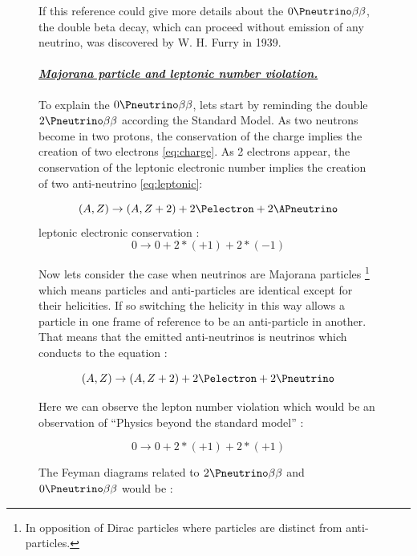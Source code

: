 \begin{figure}[!hbtp]
  If this reference \cite{ref:wikipedia_beta} could give more details about the \(0\Pneutrino\beta\beta\), the double beta decay, which can proceed without 
  emission of any neutrino, was discovered by W. H. Furry in 1939. 

  \paragraph{\underline{\emph{Majorana particle and leptonic number violation.}}}
  
  To explain the \(0\Pneutrino\beta\beta\), lets start by reminding the double \(2\Pneutrino\beta\beta\) according the Standard Model. 
  As two neutrons become in two protons, the conservation of the charge implies the creation of two electrons \ref{eq:charge}. As 2 electrons appear, 
  the conservation of the leptonic electronic number implies the creation of two anti-neutrino \ref{eq:leptonic}:  
  
  \begin{equation} \label{eq:charge}
    (A,Z) \rightarrow (A,Z+2) + 2\Pelectron + 2\APneutrino
  \end{equation}
  leptonic electronic conservation :
  \begin{equation} \label{eq:leptonic}
    0 \rightarrow 0 + 2*(+1) + 2*(-1)
  \end{equation}
  
  Now lets consider the case when neutrinos are Majorana particles \footnote{ In opposition of Dirac particles where particles are distinct from anti-particles.}
  which means particles and anti-particles are identical except for their helicities. If so switching the helicity in this way allows 
  a particle in one frame of reference to be an anti-particle in another.
  \\
  That means that the emitted anti-neutrinos is neutrinos which conducts to the equation :
  
  \begin{equation}
    (A,Z) \rightarrow (A,Z+2) + 2\Pelectron + 2\Pneutrino
  \end{equation}
  
  Here we can observe the lepton number violation which would be an observation of ``Physics beyond the standard model'' :
  
  \begin{equation}
    0 \rightarrow 0 + 2*(+1) + 2*(+1)
  \end{equation}
  
  The Feyman diagrams related to \(2\Pneutrino\beta\beta\) and \(0\Pneutrino\beta\beta\) would be \cite{ref:beta_decay}: 
  

\end{figure}
